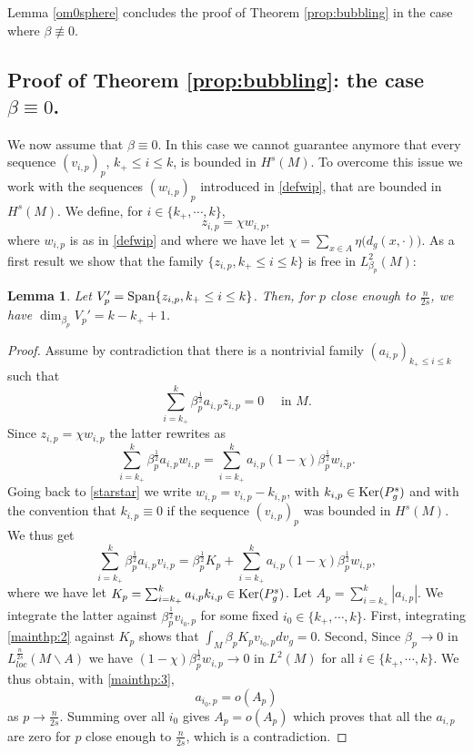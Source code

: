 \documentclass[10pt]{amsart}
\numberwithin{equation}{section}
\def\be{{\beta}}
\def\ker{{\mathop{\rm Ker}}}
\def\span{{\mathop{\rm Span}}}
\theoremstyle{plain}
\newtheorem{lemme}{Lemma}[section]%
\theoremstyle{remark}
\begin{document}
Lemma \ref{om0sphere} concludes the proof of Theorem \ref{prop:bubbling} in the case where $\beta \not \equiv 0.$


\subsection{Proof of Theorem \ref{prop:bubbling}: the case $\beta \equiv 0$.} We now assume that $\beta \equiv 0$. In this case we cannot guarantee anymore that every sequence $(v_{i,p})_p$, $k_+ \le i \le k$, is bounded in $H^s(M)$. To overcome this issue we work with the sequences $(w_{i,p})_p$ introduced in \eqref{defwip}, that are bounded in $H^s(M)$. We define, for $i \in \{k_+, \cdots, k\}$, 
\begin{equation} \label{defzip2}
z_{i,p}= \chi w_{i,p}, 
\end{equation}
where $w_{i,p}$ is as in \eqref{defwip} and where we have let $\chi =  \sum_{x \in A} \eta \big( d_g(x, \cdot) \big) $. As a first result we show that the family $\{ z_{i,p}, k_+ \le i \le k \}$ is free in $L^2_{\beta_p}(M)$:

\begin{lemme} \label{lem:independent}
Let $V'_p= \span\{z_{i,p}, k_+ \le i \le k \}$. Then, for $p$ close enough to $\frac{n}{2s}$, we have $\dim_{\beta_p} V_p' = k-k_++1$. 
\end{lemme}

\begin{proof}
Assume by contradiction that there is a nontrivial family $(a_{i,p})_{k_+ \le i \le k}$ such that 
$$\sum_{i = k_+}^k  \be_p^{\frac{1}{2}} a_{i,p} z_{i,p}=0 \quad \text{ in } M.$$
Since $z_{i,p} = \chi w_{i,p}$ the latter rewrites as 
$$  \sum_{i = k_+}^k  \be_p^{\frac{1}{2}} a_{i,p} w_{i,p} = \sum_{i = k_+}^k a_{i,p}  (1- \chi) \be_p^{\frac{1}{2}} w_{i,p}. $$
Going back to \eqref{starstar} we write $w_{i,p} = v_{i,p} - k_{i,p}$, with $k_{i,p} \in \ker(P_g^s)$ and with the convention that $k_{i,p} \equiv 0$ if the sequence $(v_{i,p})_p$ was bounded in $H^s(M)$. We thus get 
$$  \sum_{i = k_+}^k  \be_p^{\frac{1}{2}} a_{i,p} v_{i,p}=  \be_p^{\frac{1}{2}}K_ p  + \sum_{i = k_+}^k a_{i,p}  (1- \chi) \be_p^{\frac{1}{2}} w_{i,p}, $$
where we have let $ K_p = \sum_{i = k_+}^k  a_{i,p} k_{i,p} \in \ker(P_g^s)$. 
Let $A_p = \sum_{i=k_+}^k |a_{i,p}|$. We integrate the latter against $\be_p^{\frac{1}{2}}v_{i_0,p}$ for some fixed $i_0 \in \{k_+, \cdots, k\}$. First, integrating \eqref{mainthp:2} against $K_p$ shows  that $\int_M \beta_p K_p v_{i_0,p} dv_g = 0$. Second, Since $\beta_p \to 0$ in $L^{\frac{n}{2s}}_{loc}(M \backslash A)$ we have $(1-\chi) \beta_p^{\frac12} w_{i,p} \to 0$ in $L^2(M)$ for all $i \in \{k_+, \cdots, k\}$. We thus obtain, with \eqref{mainthp:3}, 
$$ a_{i_0,p} = o (A_p) $$
as $p \to \frac{n}{2s}$. Summing over all $i_0$ gives $A_p = o(A_p)$ which proves that all the $a_{i,p}$ are zero for $p$ close enough to $\frac{n}{2s}$, which is a contradiction.
\end{proof}
\end{document}
